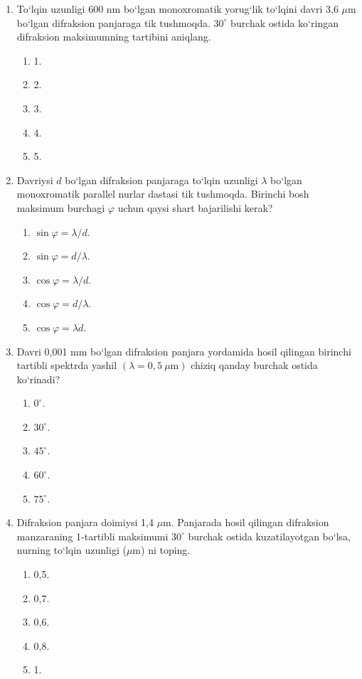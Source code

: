 \begin{enumerate}
\item To‘lqin uzunligi 600 nm bo‘lgan monoxromatik yorug‘lik to‘lqini davri 3,6 $\mu$m bo‘lgan difraksion panjaraga tik tushmoqda. $30^\circ$ burchak ostida ko‘ringan difraksion maksimumning tartibini aniqlang.
\begin{enumerate}[label=\Alph*)]
\item 1.
\item 2.
\item 3.
\item 4.
\item 5.
\end{enumerate}

\item Davriysi $d$ bo‘lgan difraksion panjaraga to‘lqin uzunligi $\lambda$ bo‘lgan monoxromatik parallel nurlar dastasi tik tushmoqda. Birinchi bosh maksimum burchagi $\varphi$ uchun qaysi shart bajarilishi kerak?
\begin{enumerate}[label=\Alph*)]
\item $\sin\varphi=\lambda/d$.
\item $\sin\varphi=d/\lambda$.
\item $\cos\varphi=\lambda/d$.
\item $\cos\varphi=d/\lambda$.
\item $\cos\varphi=\lambda d$.
\end{enumerate}

\item Davri 0,001 mm bo‘lgan difraksion panjara yordamida hosil qilingan birinchi tartibli spektrda yashil $(\lambda=0{,}5~\mu\text{m})$ chiziq qanday burchak ostida ko‘rinadi?
\begin{enumerate}[label=\Alph*)]
\item $0^\circ$.
\item $30^\circ$.
\item $45^\circ$.
\item $60^\circ$.
\item $75^\circ$.
\end{enumerate}

\item Difraksion panjara doimiysi 1,4 $\mu$m. Panjarada hosil qilingan difraksion manzaraning 1-tartibli maksimumi $30^\circ$ burchak ostida kuzatilayotgan bo‘lsa, nurning to‘lqin uzunligi ($\mu$m) ni toping.
\begin{enumerate}[label=\Alph*)]
\item 0,5.
\item 0,7.
\item 0,6.
\item 0,8.
\item 1.
\end{enumerate}


\end{enumerate}
